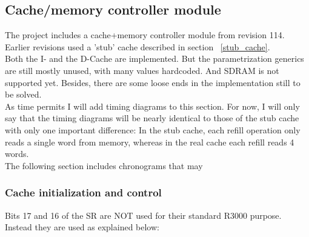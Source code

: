 \documentclass[11pt]{article}
\begin{document}
\subsection{Cache/memory controller module}
\label{cache}

    The project includes a cache+memory controller module from revision 114. 
    Earlier revisions used a 'stub' cache described in section ~\ref{stub_cache}.\\
        
    Both the I- and the D-Cache are implemented. But the parametrization 
    generics are still mostly unused, with many values hardcoded. And SDRAM is 
    not supported yet. Besides, there are some loose ends in the implementation 
    still to be solved.\\
    
    As time permits I will add timing diagrams to this section. For now, I will
    only say that the timing diagrams will be nearly identical to those of the
    stub cache with only one important difference: In the stub cache, each 
    refill operation only reads a single word from memory, whereas in the real 
    cache each refill reads 4 words.\\
    
    The following section includes chronograms that may 

\subsubsection{Cache initialization and control}
\label{cache_init_and_control}

    Bits 17 and 16 of the SR are NOT used for their standard R3000 purpose.
    Instead they are used as explained below:
    
\end{document}
